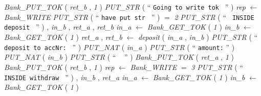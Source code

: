 \begin{tabbing}
{\em Bank\_PUT\_TOK\/}\label{Bank_PUT_TOK}  ( {\em ret\_b\/} , {\em 1\/} )  \bStatementSemiColon \bnl
{\em PUT\_STR\/}\label{PUT_STR}  (  `` {\tt Going to write tok
} ''  )  \bStatementSemiColon \bnl
{\em rep\/} $\longleftarrow$ {\em Bank\_WRITE\/}\label{Bank_WRITE}  \bStatementSemiColon \bnl
{\em PUT\_STR\/}\label{PUT_STR}  (  `` {\tt have put str
} ''  )  \-\bnl
{}  \-\bnl
{}  \bStatementSemiColon \bnl
{}  $=$ {\em 2\/} \- \bhsp {} \+\bnl
{\em PUT\_STR\/}\label{PUT_STR}  (  `` {\tt
INSIDE deposit
} ''  )  \bStatementSemiColon \bnl
{}  , {\em in\_b\/} , {\em ret\_a\/} , {\em ret\_b\/} \- \bhsp {} \+\bnl
{\em in\_a\/} $\longleftarrow$ {\em Bank\_GET\_TOK\/}\label{Bank_GET_TOK}  ( {\em 1\/} )  \bStatementSemiColon \bnl
{\em in\_b\/} $\longleftarrow$ {\em Bank\_GET\_TOK\/}\label{Bank_GET_TOK}  ( {\em 1\/} )  \bStatementSemiColon \bnl
{\em ret\_a\/} , {\em ret\_b\/} $\longleftarrow$ {\em deposit\/}\label{deposit}  ( {\em in\_a\/} , {\em in\_b\/} )  \bStatementSemiColon \bnl
{\em PUT\_STR\/}\label{PUT_STR}  (  `` {\tt deposit to accNr: } ''  )  \bStatementSemiColon \bnl
{\em PUT\_NAT\/}\label{PUT_NAT}  ( {\em in\_a\/} )  \bStatementSemiColon \bnl
{\em PUT\_STR\/}\label{PUT_STR}  (  `` {\tt  amount:} ''  )  \bStatementSemiColon \bnl
{\em PUT\_NAT\/}\label{PUT_NAT}  ( {\em in\_b\/} )  \bStatementSemiColon \bnl
{\em PUT\_STR\/}\label{PUT_STR}  (  `` {\tt
} ''  )  \bStatementSemiColon \bnl
{\em Bank\_PUT\_TOK\/}\label{Bank_PUT_TOK}  ( {\em ret\_a\/} , {\em 1\/} )  \bStatementSemiColon \bnl
{\em Bank\_PUT\_TOK\/}\label{Bank_PUT_TOK}  ( {\em ret\_b\/} , {\em 1\/} )  \bStatementSemiColon \bnl
{\em rep\/} $\longleftarrow$ {\em Bank\_WRITE\/}\label{Bank_WRITE}  \-\bnl
{}  \-\bnl
{}  \bStatementSemiColon \bnl
{}  $=$ {\em 3\/} \- \bhsp {} \+\bnl
{\em PUT\_STR\/}\label{PUT_STR}  (  `` {\tt
INSIDE withdraw
} ''  )  \bStatementSemiColon \bnl
{}  , {\em in\_b\/} , {\em ret\_a\/} \- \bhsp {} \+\bnl
{\em in\_a\/} $\longleftarrow$ {\em Bank\_GET\_TOK\/}\label{Bank_GET_TOK}  ( {\em 1\/} )  \bStatementSemiColon \bnl
{\em in\_b\/} $\longleftarrow$ {\em Bank\_GET\_TOK\/}\label{Bank_GET_TOK}  ( {\em 1\/} )  \bStatementSemiColon \bnl

\end{tabbing}
